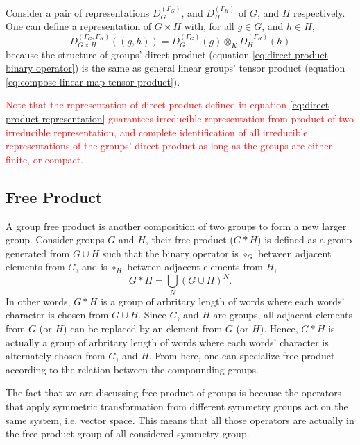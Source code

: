 \documentclass[preprint, 12pt]{revtex4-2}
\numberwithin{equation}{section}
\begin{document}
Consider a pair of representations $D^{(\Gamma_G)}_G$, and $D^{(\Gamma_H)}_H$ of $G$, and $H$ respectively. One can define a representation of $G\times H$ with, for all $g\in G$, and $h\in H$,
\begin{equation}\label{eq:direct product representation}
    D^{(\Gamma_G,\Gamma_H)}_{G\times H}((g,h)) = D^{(\Gamma_G)}_G(g)\otimes_K D^{(\Gamma_H)}_H(h)
\end{equation}
because the structure of groups' direct product (equation \ref{eq:direct product binary operator}) is the same as general linear groups' tensor product (equation \ref{eq:compose linear map tensor product}).

\textcolor{red}{
Note that the representation of direct product defined in equation \ref{eq:direct product representation} guarantees irreducible representation from product of two irreducible representation, and complete identification of all irreducible representations of the groups' direct product as long as the groups are either finite, or compact.}

\subsection{Free Product}
A group free product is another composition of two groups to form a new larger group. Consider groups $G$ and $H$, their free product ($G\ast H$) is defined as a group generated from $G\cup H$ such that the binary operator is $\circ_G$ between adjacent elements from $G$, and is $\circ_H$ between adjacent elements from $H$,
\begin{equation}\label{eq:free product}
    G\ast H = \bigcup_{N}(G\cup H)^N.
\end{equation}
In other words, $G\ast H$ is a group of arbritary length of words where each words' character is chosen from $G\cup H$. Since $G$, and $H$ are groups, all adjacent elements from $G$ (or $H$) can be replaced by an element from $G$ (or $H$). Hence, $G\ast H$ is actually a group of arbritary length of words where each words' character is alternately chosen from $G$, and $H$. From here, one can specialize free product according to the relation between the compounding groups.

The fact that we are discussing free product of groups is because the operators that apply symmetric transformation from different symmetry groups act on the same system, i.e. vector space. This means that all those operators are actually in the free product group of all considered symmetry group.
\end{document}
